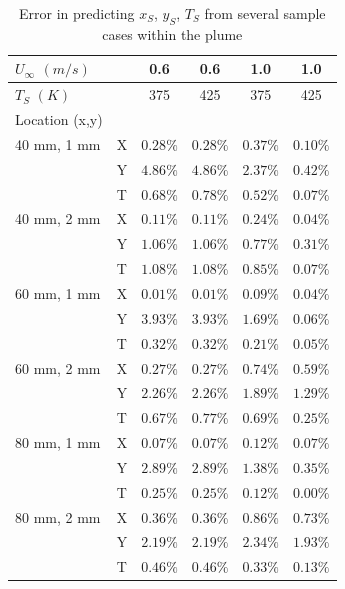 \documentclass[preprint,12pt]{elsarticle}
\begin{document}
\begin{table}[!h!t!b!p]
\begin{center}
\begin{tabular}{ l | l c c c c}
 $U_{\infty}$ $(m/s)$ & & 0.6 & 0.6 & 1.0 & 1.0 \\ \hline
 $T_S$ $(K)$ & & 375 & 425 & 375 & 425  \\ \hline \hline
 Location (x,y) & \\
 40 mm, 1 mm & X & $0.28\%$ & $0.28\%$ & $0.37\%$ & $0.10\%$ \\
 						 & Y & $4.86\%$ & $4.86\%$ & $2.37\%$ & $0.42\%$ \\
 						 & T & $0.68\%$ & $0.78\%$ & $0.52\%$ & $0.07\%$ \\ \hline
 40 mm, 2 mm & X & $0.11\%$ & $0.11\%$ & $0.24\%$ & $0.04\%$ \\ 
 						 & Y & $1.06\%$ & $1.06\%$ & $0.77\%$ & $0.31\%$ \\ 
 						 & T & $1.08\%$ & $1.08\%$ & $0.85\%$ & $0.07\%$ \\ \hline
 60 mm, 1 mm & X & $0.01\%$ & $0.01\%$ & $0.09\%$ & $0.04\%$ \\ 
						 & Y & $3.93\%$ & $3.93\%$ & $1.69\%$ & $0.06\%$ \\ 
						 & T & $0.32\%$ & $0.32\%$ & $0.21\%$ & $0.05\%$ \\ \hline
 60 mm, 2 mm & X & $0.27\%$ & $0.27\%$ & $0.74\%$ & $0.59\%$ \\ 
   					 & Y & $2.26\%$ & $2.26\%$ & $1.89\%$ & $1.29\%$ \\ 
   					 & T & $0.67\%$ & $0.77\%$ & $0.69\%$ & $0.25\%$ \\ \hline
 80 mm, 1 mm & X & $0.07\%$ & $0.07\%$ & $0.12\%$ & $0.07\%$ \\ 
  					 & Y & $2.89\%$ & $2.89\%$ & $1.38\%$ & $0.35\%$ \\ 
  					 & T & $0.25\%$ & $0.25\%$ & $0.12\%$ & $0.00\%$ \\ \hline
 80 mm, 2 mm & X & $0.36\%$ & $0.36\%$ & $0.86\%$ & $0.73\%$ \\ 
 						 & Y & $2.19\%$ & $2.19\%$ & $2.34\%$ & $1.93\%$ \\ 
 						 & T & $0.46\%$ & $0.46\%$ & $0.33\%$ & $0.13\%$ \\ \hline
 \end{tabular}
\caption{Error in predicting $x_S$, $y_S$, $T_S$ from several sample cases within the plume}
\label{tab:typeD}
\end{center}
\end{table}
\end{document}
